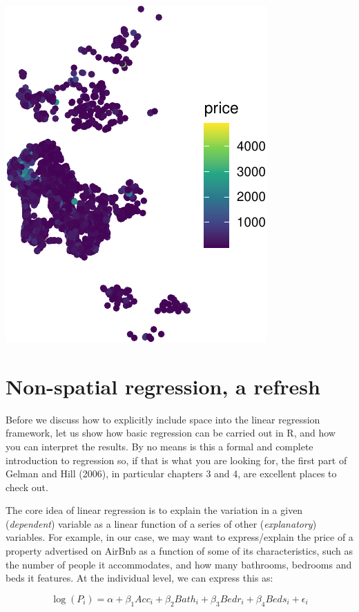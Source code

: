 \documentclass[
  letterpaper,
  DIV=11,
  numbers=noendperiod,
  oneside]{scrreprt}
\begin{document}
\includegraphics{06-spatial-econometrics_files/figure-pdf/unnamed-chunk-4-1.pdf}

\section{Non-spatial regression, a
refresh}\label{non-spatial-regression-a-refresh}

Before we discuss how to explicitly include space into the linear
regression framework, let us show how basic regression can be carried
out in R, and how you can interpret the results. By no means is this a
formal and complete introduction to regression so, if that is what you
are looking for, the first part of Gelman and Hill (2006), in particular
chapters 3 and 4, are excellent places to check out.

The core idea of linear regression is to explain the variation in a
given (\emph{dependent}) variable as a linear function of a series of
other (\emph{explanatory}) variables. For example, in our case, we may
want to express/explain the price of a property advertised on AirBnb as
a function of some of its characteristics, such as the number of people
it accommodates, and how many bathrooms, bedrooms and beds it features.
At the individual level, we can express this as:

\[
\log(P_i) = \alpha + \beta_1 Acc_i + \beta_2 Bath_i + \beta_3 Bedr_i + \beta_4 Beds_i + \epsilon_i
\]
\end{document}
